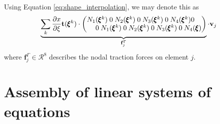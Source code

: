 Using Equation \eqref{eq:shape_interpolation}, we may denote this as 
\begin{equation}
    \underbrace{\sum_k \frac{\partial x}{\partial \xi} \mathbf{t}(\pmb{\xi}^k) \cdot \begingroup 
    \setlength\arraycolsep{-5pt}
    \begin{pmatrix}
            N_1(\pmb{\xi}^k) & 0 & N_2(\pmb{\xi}^k) & 0 & N_3(\pmb{\xi}^k) & 0 & N_4(\pmb{\xi}^k) & 0\\
            0 & N_1(\pmb{\xi}^k) & 0 & N_2(\pmb{\xi}^k) & 0 & N_3(\pmb{\xi}^k) & 0 & N_4(\pmb{\xi})\\
    \end{pmatrix} 
    \endgroup}_{\mathbf{f}^\Gamma_j}
    \cdot 
    \mathbf{v}_j
\end{equation}
where $\mathbf{f}^\Gamma_j \in \mathcal{R}^8$ describes the nodal traction forces on element $j$. 

\section{Assembly of linear systems of equations}

